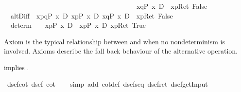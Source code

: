 \begin{isabellebody}
\ \ \ \ \ \ \ \ \ \ \ \ \ \ \ \ \ \ \ \ \ \ \ \ \ \ \ \ \ \ \ \ \ \ \ \ \ {\isacharparenleft}\ {\isacharbrackleft}{\isacharhash}\ x{\isasymleftarrow}q{\isacharbrackright}{\isacharparenleft}P\ x{\isacharparenright}\ {\isasymand}\isactrlsub D\ {\isacharbrackleft}{\isacharhash}\ x{\isasymleftarrow}p{\isacharbrackright}{\isacharparenleft}Ret\ False{\isacharparenright}\ {\isacharparenright}{\isachardoublequote}\isanewline
\ \ altD{\isacharunderscore}iff{\isacharcolon}\ {\isachardoublequote}{\isasymturnstile}\ {\isasymlangle}x{\isasymleftarrow}p{\isasymparallel}q{\isasymrangle}{\isacharparenleft}P\ x{\isacharparenright}\ {\isasymlongleftrightarrow}\isactrlsub D\ {\isasymlangle}x{\isasymleftarrow}p{\isasymrangle}{\isacharparenleft}P\ x{\isacharparenright}\ {\isasymor}\isactrlsub D\ {\isacharparenleft}{\isasymlangle}x{\isasymleftarrow}q{\isasymrangle}{\isacharparenleft}P\ x{\isacharparenright}\ {\isasymand}\isactrlsub D\ {\isacharbrackleft}{\isacharhash}\ x{\isasymleftarrow}p{\isacharbrackright}{\isacharparenleft}Ret\ False{\isacharparenright}{\isacharparenright}{\isachardoublequote}\isanewline
\ \ determ{\isacharcolon}\ \ \ {\isachardoublequote}{\isasymturnstile}\ {\isasymlangle}x{\isasymleftarrow}p{\isasymrangle}{\isacharparenleft}P\ x{\isacharparenright}\ {\isasymlongleftrightarrow}\isactrlsub D\ {\isacharbrackleft}{\isacharhash}\ x{\isasymleftarrow}p{\isacharbrackright}{\isacharparenleft}P\ x{\isacharparenright}\ {\isasymand}\isactrlsub D\ {\isasymlangle}x{\isasymleftarrow}p{\isasymrangle}{\isacharparenleft}Ret\ True{\isacharparenright}{\isachardoublequote}\isamarkupfalse%
%
\begin{isamarkuptext}%
Axiom  is the typical relationship between  and  
  when no nondeterminism is involved. Axioms  describe the 
  fall back behaviour of the alternative operation.%
\end{isamarkuptext}%
\isamarkuptrue%
%
\begin{isamarkuptext}%
 implies .%
\end{isamarkuptext}%
\isamarkuptrue%
\ dsef{\isacharunderscore}eot{\isacharcolon}\ {\isachardoublequote}dsef\ eot{\isachardoublequote}\isanewline
\ \ \isamarkupfalse%
\ {\isacharparenleft}simp\ add{\isacharcolon}\ eot{\isacharunderscore}def\ dsef{\isacharunderscore}seq\ dsef{\isacharunderscore}ret\ dsef{\isacharunderscore}getInput{\isacharparenright}\isamarkupfalse%

\end{isabellebody}
